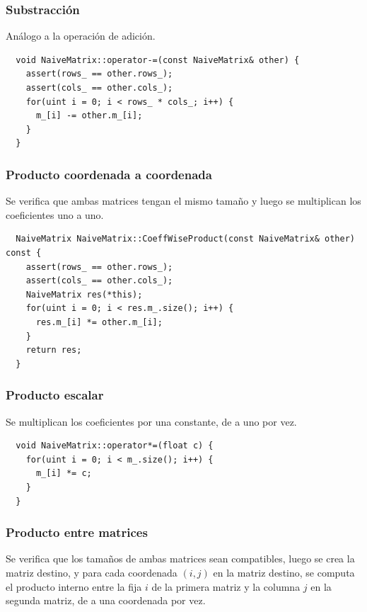 \documentclass[a4paper, 10pt, twoside]{article}
\begin{document}
\subsubsection{Substracción}

Análogo a la operación de adición.

\begin{verbatim}
  void NaiveMatrix::operator-=(const NaiveMatrix& other) {
    assert(rows_ == other.rows_);
    assert(cols_ == other.cols_);
    for(uint i = 0; i < rows_ * cols_; i++) {
      m_[i] -= other.m_[i];
    }
  }
\end{verbatim}


\subsubsection{Producto coordenada a coordenada}

Se verifica que ambas matrices tengan el mismo tamaño y luego se multiplican
los coeficientes uno a uno.

\begin{verbatim}
  NaiveMatrix NaiveMatrix::CoeffWiseProduct(const NaiveMatrix& other) const {
    assert(rows_ == other.rows_);
    assert(cols_ == other.cols_);
    NaiveMatrix res(*this);
    for(uint i = 0; i < res.m_.size(); i++) {
      res.m_[i] *= other.m_[i];
    }
    return res;
  }
\end{verbatim}


\subsubsection{Producto escalar}

Se multiplican los coeficientes por una constante, de a uno por vez.

\begin{verbatim}
  void NaiveMatrix::operator*=(float c) {
    for(uint i = 0; i < m_.size(); i++) {
      m_[i] *= c;
    }
  }
\end{verbatim}


\subsubsection{Producto entre matrices}

Se verifica que los tamaños de ambas matrices sean compatibles, luego se crea
la matriz destino, y para cada coordenada $(i, j)$ en la matriz destino, se
computa el producto interno entre la fija $i$ de la primera matriz y la columna
$j$ en la segunda matriz, de a una coordenada por vez.
\end{document}

